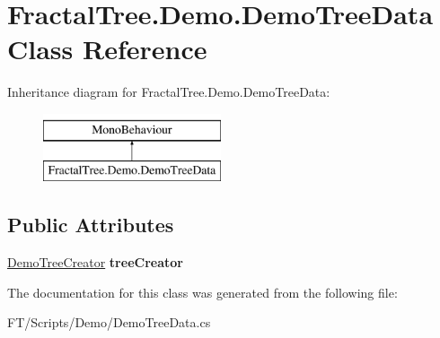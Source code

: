 \hypertarget{class_fractal_tree_1_1_demo_1_1_demo_tree_data}{}\section{Fractal\+Tree.\+Demo.\+Demo\+Tree\+Data Class Reference}
\label{class_fractal_tree_1_1_demo_1_1_demo_tree_data}
Inheritance diagram for Fractal\+Tree.\+Demo.\+Demo\+Tree\+Data\+:\begin{figure}[H]
\begin{center}
\leavevmode
\includegraphics[height=2.000000cm]{class_fractal_tree_1_1_demo_1_1_demo_tree_data}
\end{center}
\end{figure}
\subsection*{Public Attributes}
\begin{DoxyCompactItemize}
\item 
\mbox{\label{class_fractal_tree_1_1_demo_1_1_demo_tree_data_a2d91fd17585a79e5389e4b30e12fa9fc}} 
\hyperlink{class_fractal_tree_1_1_demo_1_1_demo_tree_creator}{Demo\+Tree\+Creator} {\bfseries tree\+Creator}
\end{DoxyCompactItemize}


The documentation for this class was generated from the following file\+:\begin{DoxyCompactItemize}
\item 
F\+T/\+Scripts/\+Demo/Demo\+Tree\+Data.\+cs\end{DoxyCompactItemize}
